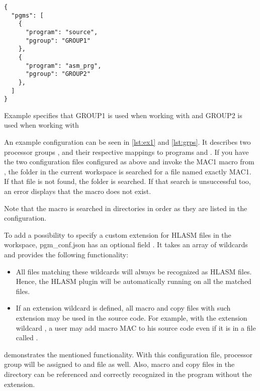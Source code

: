 \begin{listing}
	\begin{verbatim}
{
  "pgms": [
    {
      "program": "source",
      "pgroup": "GROUP1"
    },
    {
      "program": "asm_prg",
      "pgroup": "GROUP2"
    },
  ]
}
	\end{verbatim}
	\caption{Example  specifies that GROUP1 is used when working with  and GROUP2 is used when working with }
	\label{lst:grps}
\end{listing}

An example configuration can be seen in \cref{lst:ex1} and \cref{lst:grps}. It describes two processor groups ,  and their respective mappings to programs  and . If you have the two configuration files configured as above and invoke the MAC1 macro from , the folder  in the current workspace is searched for a file named exactly MAC1. If that file is not found, the folder  is searched. If that search is unsuccessful too, an error displays that the macro does not exist.

Note that the macro  is searched in directories in order as they are listed in the configuration. 

To add a possibility to specify a custom extension for HLASM files in the workspace, {pgm\_conf.json} has an optional field . It takes an array of wildcards and provides the following functionality:
\begin{itemize}
	\item All files matching these wildcards will always be recognized as HLASM files. Hence, the HLASM plugin will be automatically running on all the matched files.
	\item If an extension wildcard is defined, all macro and copy files with such extension may be used in the source code. For example, with the extension wildcard , a user may add macro MAC to his source code even if it is in a file called .
\end{itemize}

 demonstrates the mentioned functionality. With this configuration file, processor group  will be assigned to  and  file as well. Also, macro and copy files in the  directory can be referenced and correctly recognized in the program without the  extension.


